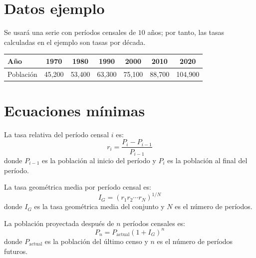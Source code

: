 \documentclass[12pt]{article}
\begin{document}

\section{Datos ejemplo}
Se usará una serie con períodos censales de $10$ años; por tanto, las tasas calculadas en el ejemplo son tasas por década.

\begin{center}
\begin{tabular}{lcccccc}
\toprule
Año & 1970 & 1980 & 1990 & 2000 & 2010 & 2020 \\
\midrule
Población & 45,200 & 53,400 & 63,300 & 75,100 & 88,700 & 104,900 \\
\bottomrule
\end{tabular}
\end{center}

\section{Ecuaciones mínimas}
La tasa relativa del período censal $i$ es:
\begin{equation}
r_i=\frac{P_i-P_{i-1}}{P_{i-1}}
\end{equation}
donde $P_{i-1}$ es la población al inicio del período y $P_i$ es la población al final del período.

La tasa geométrica media por período censal es:
\begin{equation}
I_G=\left(r_1r_2\cdots r_N\right)^{1/N}
\end{equation}
donde $I_G$ es la tasa geométrica media del conjunto y $N$ es el número de períodos.

La población proyectada después de $n$ períodos censales es:
\begin{equation}
P_n=P_{\text{actual}}(1+I_G)^n
\end{equation}
donde $P_{\text{actual}}$ es la población del último censo y $n$ es el número de períodos futuros.

\end{document}
